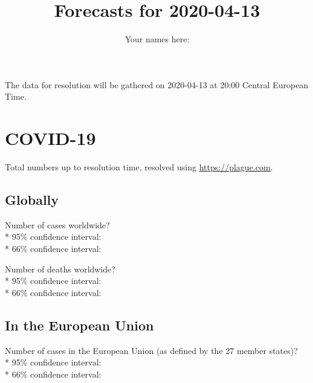 \documentclass{article}
\title{Forecasts for 2020-04-13}
\begin{document}
\date{\vspace{-7ex}}

\author{Your names here: \underline{\hspace{10cm}}}

\maketitle

\vspace{0.5cm}

The data for resolution will be gathered on 2020-04-13 at 20:00 Central
European Time.

\section*{COVID-19}

Total numbers up to resolution time, resolved using
\href{https://plague.com/}{https://plague.com}.

\subsection*{Globally}

Number of cases worldwide?\\*
95\% confidence interval: \null\hfill\underline{\hspace{8cm}}\\*
66\% confidence interval: \null\hfill\underline{\hspace{8cm}}

\vspace{0.3cm}

Number of deaths worldwide?\\*
95\% confidence interval: \null\hfill\underline{\hspace{8cm}}\\*
66\% confidence interval: \null\hfill\underline{\hspace{8cm}}

\subsection*{In the European Union}

Number of cases in the European Union (as defined by the 27 member
states)?\\*
95\% confidence interval: \null\hfill\underline{\hspace{8cm}}\\*
66\% confidence interval: \null\hfill\underline{\hspace{8cm}}
\end{document}
